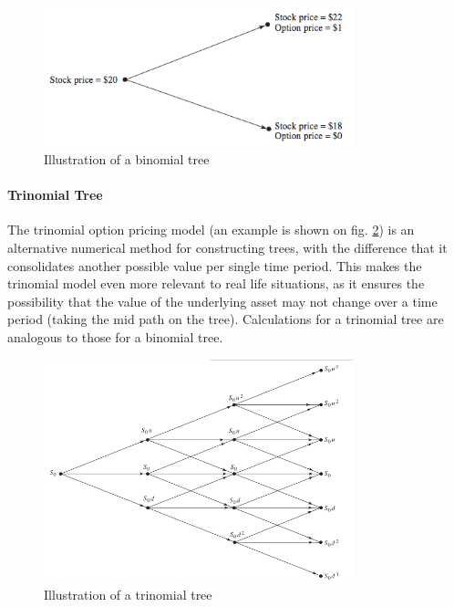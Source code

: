 \begin{figure}[H]
	\centering
	\includegraphics[width=0.8\textwidth]{img/binomtree.png}
	\caption{Illustration of a binomial tree}
	\label{fig:background:binomtree}
\end{figure}

\paragraph{Trinomial Tree}
The trinomial option pricing model (an example is shown on fig. \ref{fig:background:trinomtree}) is an alternative numerical method for constructing trees, with the difference that it consolidates another possible value per single time period. This makes the trinomial model even more relevant to real life situations, as it ensures the possibility that the value of the underlying asset may not change over a time period (taking the mid path on the tree). Calculations for a trinomial tree are analogous to those for a binomial tree.

\begin{figure}[H]
	\centering
	\includegraphics[width=0.8\textwidth]{img/trinomtree.png}
	\caption{Illustration of a trinomial tree}
	\label{fig:background:trinomtree}
\end{figure}

